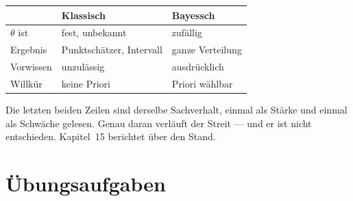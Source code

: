 \begin{warnung}
\begin{center}
{\small
\renewcommand{\arraystretch}{1.5}
\begin{tabular}{@{}P{2.0cm}P{3.2cm}P{3.2cm}@{}}
\toprule
& \textbf{Klassisch} & \textbf{Bayessch}\\
\midrule
$\theta$ ist & fest, unbekannt & zufällig\\
Ergebnis & Punktschätzer, Intervall & ganze Verteilung\\
Vorwissen & \textcolor{akzent}{unzulässig} & \textcolor{gruen}{ausdrücklich}\\
Willkür & \textcolor{gruen}{keine Priori} & \textcolor{akzent}{Priori wählbar}\\
\bottomrule
\end{tabular}}
\end{center}

Die letzten beiden Zeilen sind derselbe Sachverhalt, einmal als Stärke und einmal als Schwäche gelesen. Genau daran verläuft der Streit --- und er ist nicht entschieden. Kapitel~15 berichtet über den Stand.
\end{warnung}

\section{Übungsaufgaben}

